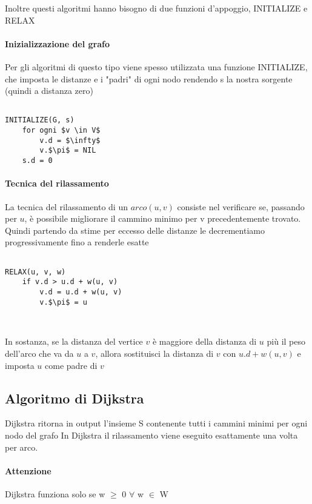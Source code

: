 \documentclass[12pt, a4paper, openany]{book}
\begin{document}
Inoltre questi algoritmi hanno bisogno di due funzioni d'appoggio, INITIALIZE e RELAX

\paragraph*{Inizializzazione del grafo}
Per gli algoritmi di questo tipo viene spesso utilizzata una funzione INITIALIZE, che imposta
le distanze e i "padri" di ogni nodo rendendo s la nostra sorgente (quindi a distanza zero)

\begin{lstlisting}[mathescape=true]

INITIALIZE(G, s)
    for ogni $v \in V$
        v.d = $\infty$
        v.$\pi$ = NIL
    s.d = 0
\end{lstlisting}

\paragraph{Tecnica del rilassamento}
La tecnica del rilassamento di un $arco (u,v)$ consiste nel verificare se, passando per $u$, è possibile migliorare il cammino minimo
per v precedentemente trovato. Quindi partendo da stime per eccesso delle distanze le decrementiamo progressivamente
fino a renderle esatte

\begin{lstlisting}[mathescape=true]

RELAX(u, v, w)
    if v.d > u.d + w(u, v)
        v.d = u.d + w(u, v)
        v.$\pi$ = u
    
    
\end{lstlisting}

In sostanza, se la distanza del vertice $v$ è maggiore della distanza di $u$ più il peso
dell'arco che va da $u$ a $v$, allora sostituisci la distanza di $v$ con $u.d + w(u, v)$
e imposta $u$ come padre di $v$

\subsection{Algoritmo di Dijkstra}
Dijkstra ritorna in output l'insieme S contenente tutti i cammini minimi per ogni nodo del grafo
In Dijkstra il rilassamento viene eseguito esattamente una volta per arco.

\paragraph{Attenzione}
Dijkstra funziona solo se w $\geq$  0 $\forall$ w $\in$ W
\end{document}
